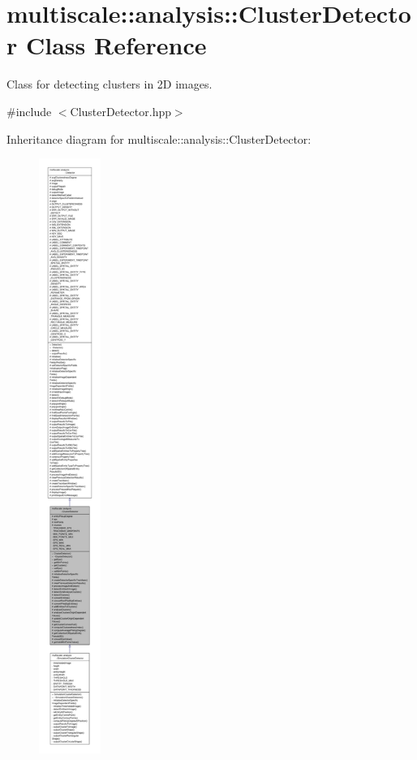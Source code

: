 \hypertarget{classmultiscale_1_1analysis_1_1ClusterDetector}{\section{multiscale\-:\-:analysis\-:\-:Cluster\-Detector Class Reference}
\label{classmultiscale_1_1analysis_1_1ClusterDetector}
}


Class for detecting clusters in 2\-D images.  




{\ttfamily \#include $<$Cluster\-Detector.\-hpp$>$}



Inheritance diagram for multiscale\-:\-:analysis\-:\-:Cluster\-Detector\-:
\nopagebreak
\begin{figure}[H]
\begin{center}
\leavevmode
\includegraphics[height=550pt]{classmultiscale_1_1analysis_1_1ClusterDetector__inherit__graph}
\end{center}
\end{figure}


